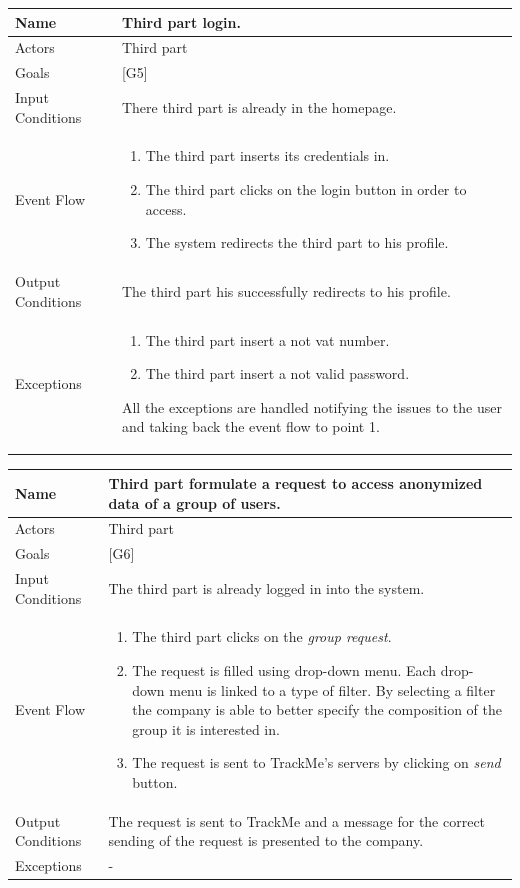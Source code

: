 \documentclass{article}
\begin{document}
\begin{center}
    \begin{tabular}{ | l | p{10cm} |}
    \hline
    Name & Third part login.\\ \hline
    Actors & Third part\\ \hline
   	Goals & {[G5]}\\ \hline
    Input Conditions & There third part is already in the homepage.\\ \hline
    Event Flow & \begin{enumerate}
    	\item The third part inserts its credentials in.
		\item The third part clicks on the login button in order to access.
		\item The system redirects the third part to his profile.
    \end{enumerate} \\ \hline
    Output Conditions & The third part his successfully redirects to his profile.  \\ \hline
    Exceptions & \begin{enumerate}
   \item The third part insert a not vat number.
	\item The third part insert a not valid password.
\end{enumerate} All the exceptions are handled notifying the issues to the user and taking back the event flow to point 1.    \\ \hline
    \end{tabular}
\end{center}

\begin{center}
    \begin{tabular}{ | l | p{10cm} |}
    \hline
    Name & Third part formulate a request to access anonymized data of a group of users.\\ \hline
    Actors & Third part\\ \hline
   	Goals & {[G6]}\\ \hline
    Input Conditions & The third part is already logged in into the system.\\ \hline
    Event Flow & \begin{enumerate}
    	\item The third part clicks on the \emph{group request}.
    	\item The request is filled using drop-down menu. Each drop-down menu is linked to a type of filter. By selecting a filter the company is able to better specify the composition of the group it is interested in.
		\item The request is sent to TrackMe's servers by clicking on \emph{send} button. 
    \end{enumerate} \\ \hline
    Output Conditions & The request is sent to TrackMe and a message for the correct sending of the request is presented to the company. \\ \hline
    Exceptions & -   \\ \hline
    \end{tabular}
\end{center}
\end{document}
